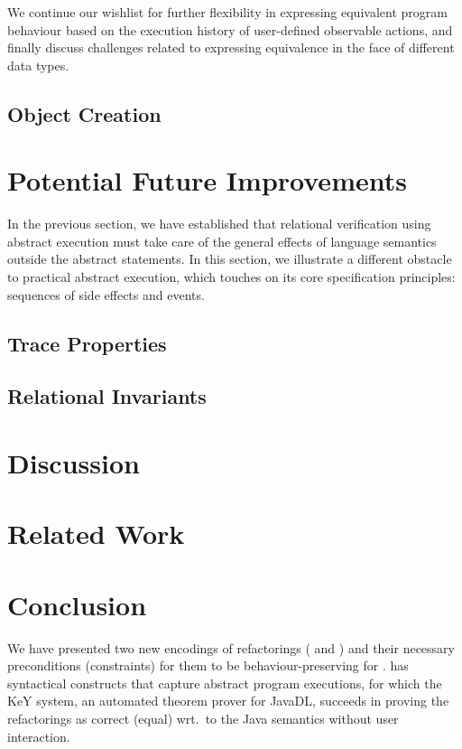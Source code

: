 \documentclass[runningheads]{llncs}
\begin{document}
We continue our wishlist for further flexibility in expressing equivalent program behaviour based on the execution history of user-defined observable actions,
and finally discuss challenges related to expressing equivalence in the face of different data types.


\subsection{Object Creation}\label{sec:objectcreation}


\section{Potential Future Improvements}\label{sec:future}
In the previous section, we have established that relational verification using abstract execution
must take care of the general effects of language semantics outside the abstract statements.
In this section, we illustrate a different obstacle to practical abstract execution, which touches on its core specification principles: sequences of side effects and events.

\subsection{Trace Properties}\label{sec:traces}


\subsection{Relational Invariants}\label{sec:relational}


\section{Discussion}\label{sec:discussion}


\section{Related Work}\label{sec:related}


\section{Conclusion}\label{sec:conclusion}

We have presented two new encodings of refactorings ( and ) and their necessary preconditions (constraints) for them to be behaviour-preserving for \Refinity{}.
\Refinity{} has syntactical constructs that capture abstract program executions, for which the KeY system,
an automated theorem prover for JavaDL, succeeds in proving the refactorings as correct (equal) wrt.\ to the Java semantics without user interaction.
\end{document}
